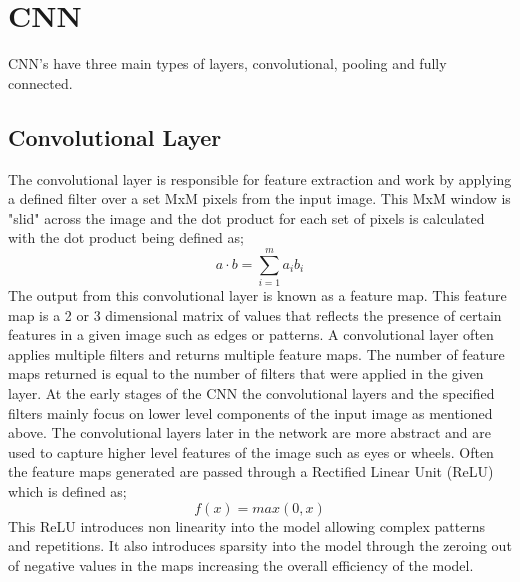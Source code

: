\documentclass[10pt,twocolumn,letterpaper]{article}
\begin{document}
\section{CNN}
CNN's have three main types
of layers, convolutional, pooling and fully connected.
\subsection{Convolutional Layer}
The convolutional layer is responsible 
for feature extraction and work by applying a defined filter over a set MxM pixels from 
the input image. This MxM window is "slid" across the image and the dot product for each 
set of pixels is calculated with the dot product being defined as;
\begin{equation}
   a \cdot b = \sum_{i=1}^{m}a_{i}b_{i}
\end{equation}
The output from this convolutional layer is known as a feature map. This feature map 
is a 2 or 3 dimensional matrix of values that reflects the presence of certain 
features in a given image such as edges or patterns. A convolutional layer often 
applies multiple filters and returns multiple feature maps. The number of feature 
maps returned is equal to the number of filters that were applied in the given layer.
At the early stages of the CNN the convolutional layers and the specified filters mainly
focus on lower level components of the input image as mentioned above. The convolutional 
layers later in the network are more abstract and are used to capture higher level features 
of the image such as eyes or wheels. Often the feature maps generated are passed through a 
Rectified Linear Unit (ReLU) which is defined as;
\begin{equation}
   f(x) = max(0,x)
\end{equation}
This ReLU introduces non linearity into the model allowing complex patterns and repetitions.
It also introduces sparsity into the model through the zeroing out of negative values in 
the maps increasing the overall efficiency of the model. 
\end{document}
